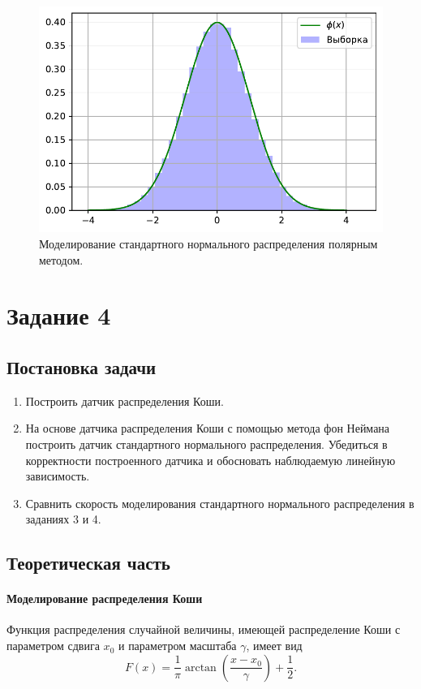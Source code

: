 \documentclass[16pt]{article}
\begin{document}
\begin{figure}[h]
	\center
	\includegraphics[scale=0.7]{3_4.pdf}
	\caption{Моделирование стандартного нормального распределения полярным методом.}
\end{figure}

\section{Задание 4}
\subsection{Постановка задачи}
\begin{enumerate}
\item Построить датчик распределения Коши.
\item На основе датчика распределения Коши с помощью метода фон Неймана построить датчик стандартного нормального распределения. Убедиться в корректности построенного датчика и обосновать наблюдаемую линейную зависимость.
\item Сравнить скорость моделирования стандартного нормального распределения в заданиях 3 и 4.
\end{enumerate}

\subsection{Теоретическая часть}
\paragraph{Моделирование распределения Коши}
Функция распределения случайной величины, имеющей распределение Коши с параметром сдвига $x_0$ и параметром масштаба $\gamma$, имеет вид
$$F(x) = \frac{1}{\pi} \arctan\left(\frac{x-x_0}{\gamma}\right) + \frac12.$$
\end{document}

